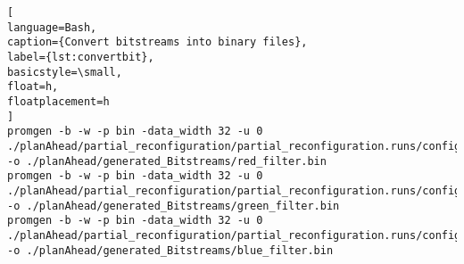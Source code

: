 \begin{lstlisting}[
language=Bash,
caption={Convert bitstreams into binary files},
label={lst:convertbit},
basicstyle=\small,
float=h,
floatplacement=h
]
promgen -b -w -p bin -data_width 32 -u 0 ./planAhead/partial_reconfiguration/partial_reconfiguration.runs/config_1/config_1_simple_filter_0_simple_filter_0_USER_LOGIC_I_filter_logic_0_red_filter_partial.bit -o ./planAhead/generated_Bitstreams/red_filter.bin
promgen -b -w -p bin -data_width 32 -u 0 ./planAhead/partial_reconfiguration/partial_reconfiguration.runs/config_2/config_2_simple_filter_0_simple_filter_0_USER_LOGIC_I_filter_logic_0_green_filter_partial.bit -o ./planAhead/generated_Bitstreams/green_filter.bin
promgen -b -w -p bin -data_width 32 -u 0 ./planAhead/partial_reconfiguration/partial_reconfiguration.runs/config_3/config_3_simple_filter_0_simple_filter_0_USER_LOGIC_I_filter_logic_0_blue_filter_partial.bit -o ./planAhead/generated_Bitstreams/blue_filter.bin
\end{lstlisting}